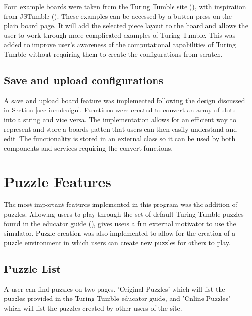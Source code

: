 \documentclass{l4proj}
\begin{document}
Four example boards were taken from the Turing Tumble site (\cite{turing_tumble_site}), with inspiration from JSTumble (\cite{jstumble}). These examples can be accessed by a button press on the plain board page. It will add the selected piece layout to the board and allows the user to work through more complicated examples of Turing Tumble. This was added to improve user's awareness of the computational capabilities of Turing Tumble without requiring them to create the configurations from scratch. 

\subsection{Save and upload configurations}
\label{section:save-upload}
A save and upload board feature was implemented following the design discussed in Section \ref{section:design}. Functions were created to convert an array of slots into a string and vice versa. The implementation allows for an efficient way to represent and store a boards patten that users can then easily understand and edit. The functionality is stored in an external class so it can be used by both components and services requiring the convert functions.

\section{Puzzle Features}
The most important features implemented in this program was the addition of puzzles. Allowing users to play through the set of default Turing Tumble puzzles found in the educator guide (\cite{educator_resources}), gives users a fun external motivator to use the simulator. Puzzle creation was also implemented to allow for the creation of a puzzle environment in which users can create new puzzles for others to play.

\subsection{Puzzle List}
\label{section:puzzleList}
A user can find puzzles on two pages. 'Original Puzzles' which will list the puzzles provided in the Turing Tumble educator guide, and 'Online Puzzles' which will list the puzzles created by other users of the site.
\end{document}
